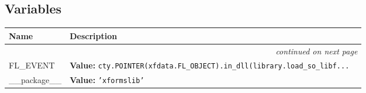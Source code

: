   \subsection{Variables}

    \vspace{-1cm}
\hspace{\varindent}\begin{longtable}{|p{\varnamewidth}|p{\vardescrwidth}|l}
\cline{1-2}
\cline{1-2} \centering \textbf{Name} & \centering \textbf{Description}& \\
\cline{1-2}
\endhead\cline{1-2}\multicolumn{3}{r}{\small\textit{continued on next page}}\\\endfoot\cline{1-2}
\endlastfoot\raggedright F\-L\-\_\-E\-V\-E\-N\-T\- & \raggedright \textbf{Value:} 
{\tt cty.POINTER(xfdata.FL\_OBJECT).in\_dll(library.load\_so\_libf\texttt{...}}&\\
\cline{1-2}
\raggedright \_\-\_\-p\-a\-c\-k\-a\-g\-e\-\_\-\_\- & \raggedright \textbf{Value:} 
{\tt \texttt{'}\texttt{xformslib}\texttt{'}}&\\
\cline{1-2}
\end{longtable}

